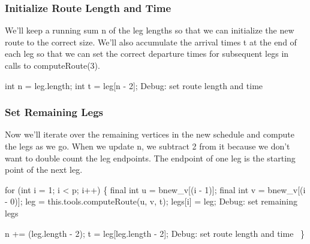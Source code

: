 \subsubsection{Initialize Route Length and Time}

We'll keep a running sum {\Tt{}n\nwendquote} of the leg lengths so that we can initialize the
new route to the correct size. We'll also accumulate the arrival times {\Tt{}t\nwendquote} at
the end of each leg so that we can set the correct departure times for
subsequent legs in calls to {\Tt{}computeRoute\nwendquote}(3).

\nwenddocs{}\endmoddef\nwstartdeflinemarkup{}\nwenddeflinemarkup
int n = leg.length;
int t = leg[n - 2];
\LA{}Debug: set route length and time~{\nwtagstyle{}}\RA{}
\nwendcode{}\nwdocspar

\subsubsection{Set Remaining Legs}

Now we'll iterate over the remaining vertices in the new schedule and compute
the legs as we go. When we update {\Tt{}n\nwendquote}, we subtract 2 from it because we don't
want to double count the leg endpoints. The endpoint of one leg is the starting
point of the next leg.

\nwenddocs{}\endmoddef\nwstartdeflinemarkup{}\nwenddeflinemarkup
for (int i = 1; i < p; i++) \{
  final int u = bnew_v[(i - 1)];
  final int v = bnew_v[(i - 0)];
  leg = this.tools.computeRoute(u, v, t);
  legs[i] = leg;
  \LA{}Debug: set remaining legs~{\nwtagstyle{}}\RA{}

  n += (leg.length - 2);
  t = leg[leg.length - 2];
  \LA{}Debug: set route length and time~{\nwtagstyle{}}\RA{}
\}
\nwendcode{}\nwdocspar


